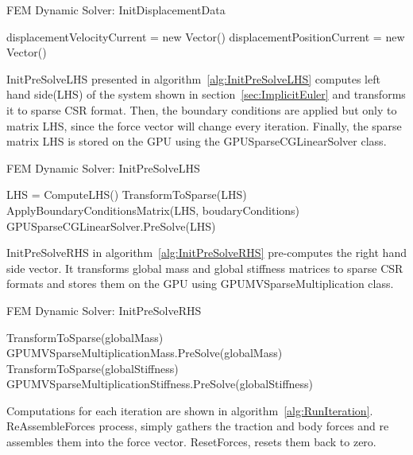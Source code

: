 \documentclass[en]{minipw} %
\begin{document}
\begin{algorithm}
\caption{FEM Dynamic Solver: InitDisplacementData}
\label{alg:InitDisplacementData}
\begin{algorithmic}[1]
\State displacementVelocityCurrent = new Vector()
\State displacementPositionCurrent = new Vector()
\EndProcedure
\end{algorithmic}
\end{algorithm}

InitPreSolveLHS presented in algorithm~\ref{alg:InitPreSolveLHS} computes left hand side(LHS) of the system shown in section~\ref{sec:ImplicitEuler} and transforms it to sparse CSR format. Then, the boundary conditions are applied but only to matrix LHS, since the force vector will change every iteration. Finally, the sparse matrix LHS is stored on the GPU using the GPUSparseCGLinearSolver class. 

\begin{algorithm}
\caption{FEM Dynamic Solver: InitPreSolveLHS}
\label{alg:InitPreSolveLHS}
\begin{algorithmic}[1]
\State LHS = ComputeLHS()
\State TransformToSparse(LHS)
\State ApplyBoundaryConditionsMatrix(LHS, boudaryConditions)
\State GPUSparseCGLinearSolver.PreSolve(LHS)
\EndProcedure
\end{algorithmic}
\end{algorithm}

InitPreSolveRHS in algorithm~\ref{alg:InitPreSolveRHS} pre-computes the right hand side vector. It transforms global mass and global stiffness matrices to sparse CSR formats and stores them on the GPU using GPUMVSparseMultiplication class.

\begin{algorithm}
\caption{FEM Dynamic Solver: InitPreSolveRHS}
\label{alg:InitPreSolveRHS}
\begin{algorithmic}[1]
\State TransformToSparse(globalMass)
\State GPUMVSparseMultiplicationMass.PreSolve(globalMass)
\State TransformToSparse(globalStiffness)
\State GPUMVSparseMultiplicationStiffness.PreSolve(globalStiffness)
\EndProcedure
\end{algorithmic}
\end{algorithm}

Computations for each iteration are shown in algorithm~\ref{alg:RunIteration}. ReAssembleForces process, simply gathers the traction and body forces and re assembles them into the force vector. ResetForces, resets them back to zero.
\end{document}

